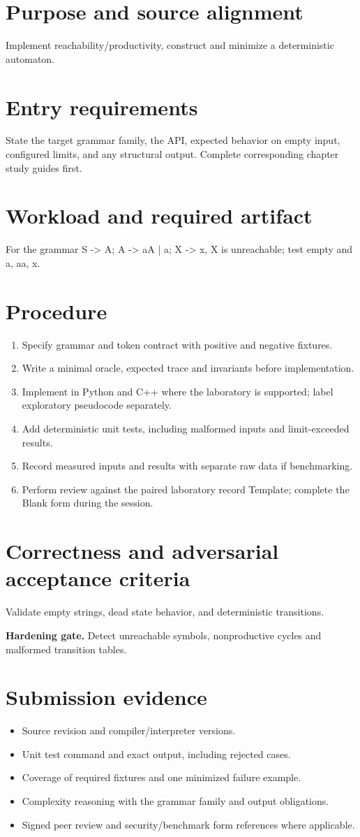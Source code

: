\documentclass[11pt,letterpaper]{article}
\begin{document}
\makedoctitle\makedocsummary
\tableofcontents\clearpage
\section{Purpose and source alignment}
Implement reachability/productivity, construct and minimize a deterministic automaton.
\section{Entry requirements}
State the target grammar family, the API, expected behavior on empty input, configured limits, and any structural output. Complete corresponding chapter study guides first.
\section{Workload and required artifact}
For the grammar S -> A; A -> aA | a; X -> x, X is unreachable; test empty and a, aa, x.
\section{Procedure}
\begin{enumerate}\item Specify grammar and token contract with positive and negative fixtures.\item Write a minimal oracle, expected trace and invariants before implementation.\item Implement in Python and C++ where the laboratory is supported; label exploratory pseudocode separately.\item Add deterministic unit tests, including malformed inputs and limit-exceeded results.\item Record measured inputs and results with separate raw data if benchmarking.\item Perform review against the paired laboratory record Template; complete the Blank form during the session.\end{enumerate}
\section{Correctness and adversarial acceptance criteria}
Validate empty strings, dead state behavior, and deterministic transitions.\par\textbf{Hardening gate.} Detect unreachable symbols, nonproductive cycles and malformed transition tables.
\section{Submission evidence}
\begin{itemize}\item Source revision and compiler/interpreter versions.\item Unit test command and exact output, including rejected cases.\item Coverage of required fixtures and one minimized failure example.\item Complexity reasoning with the grammar family and output obligations.\item Signed peer review and security/benchmark form references where applicable.\end{itemize}
\end{document}

